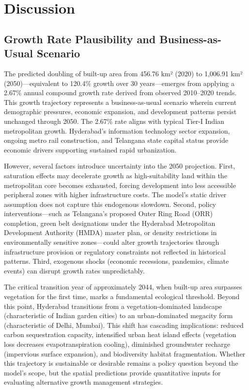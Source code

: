\documentclass[conference]{IEEEtran}
\begin{document}
\section{Discussion}

\subsection{Growth Rate Plausibility and Business-as-Usual Scenario}

The predicted doubling of built-up area from 456.76 km² (2020) to 1,006.91 km² (2050)—equivalent to 120.4\% growth over 30 years—emerges from applying a 2.67\% annual compound growth rate derived from observed 2010--2020 trends. This growth trajectory represents a business-as-usual scenario wherein current demographic pressures, economic expansion, and development patterns persist unchanged through 2050. The 2.67\% rate aligns with typical Tier-I Indian metropolitan growth.  Hyderabad's information technology sector expansion, ongoing metro rail construction, and Telangana state capital status provide economic drivers supporting sustained rapid urbanization.

However, several factors introduce uncertainty into the 2050 projection. First, saturation effects may decelerate growth as high-suitability land within the metropolitan core becomes exhausted, forcing development into less accessible peripheral zones with higher infrastructure costs. The model's static driver assumption does not capture this endogenous slowdown. Second, policy interventions—such as Telangana's proposed Outer Ring Road (ORR) completion, green belt designations under the Hyderabad Metropolitan Development Authority (HMDA) master plan, or density restrictions in environmentally sensitive zones—could alter growth trajectories through infrastructure provision or regulatory constraints not reflected in historical patterns. Third, exogenous shocks (economic recessions, pandemics, climate events) can disrupt growth rates unpredictably.

The critical transition year of approximately 2044, when built-up area surpasses vegetation for the first time, marks a fundamental ecological threshold. Beyond this point, Hyderabad transitions from a vegetation-dominated landscape (characteristic of Indian garden cities) to an urban-dominated megacity form (characteristic of Delhi, Mumbai). This shift has cascading implications: reduced carbon sequestration capacity, intensified urban heat island effects (vegetation loss decreases evapotranspiration cooling), diminished groundwater recharge (impervious surface expansion), and biodiversity habitat fragmentation. Whether this trajectory is sustainable or desirable remains a policy question beyond the model's scope, but the spatial predictions provide quantitative inputs for evaluating alternative growth management strategies.
\end{document}
